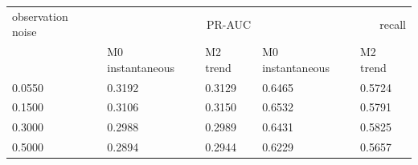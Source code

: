 \begin{tabular}{lllll}
\toprule
observation noise & \multicolumn{2}{r}{PR-AUC} & \multicolumn{2}{r}{recall} \\
 & M0 instantaneous & M2 trend & M0 instantaneous & M2 trend \\
\midrule
0.0550 & 0.3192 & 0.3129 & 0.6465 & 0.5724 \\
0.1500 & 0.3106 & 0.3150 & 0.6532 & 0.5791 \\
0.3000 & 0.2988 & 0.2989 & 0.6431 & 0.5825 \\
0.5000 & 0.2894 & 0.2944 & 0.6229 & 0.5657 \\
\bottomrule
\end{tabular}
